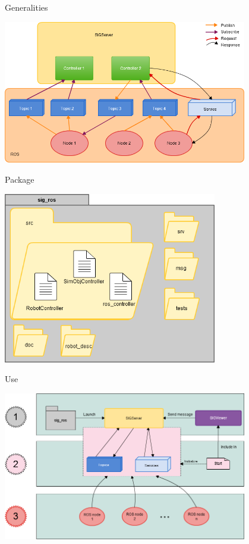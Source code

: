 \documentclass[11pt]{beamer}
\begin{document}
\begin{frame}{Generalities}
	\begin{center}
		\includegraphics[width=0.8\textwidth]{images/sig_ros_general.png}
	\end{center}
\end{frame}

\begin{frame}{Package}
	\begin{center}
		\includegraphics[width=0.7\textwidth]{images/package_sig_ros.png}
	\end{center}
\end{frame}

\begin{frame}{Use}
	\begin{center}
		\includegraphics[width=0.8\textwidth]{images/usage.png}
	\end{center}
\end{frame}
\end{document}
